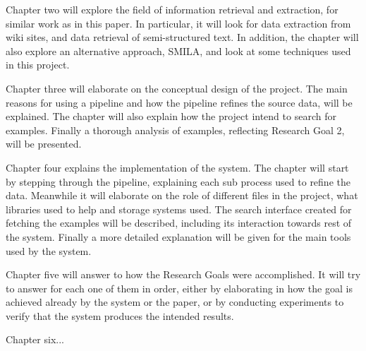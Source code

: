 Chapter two will explore the field of information retrieval and extraction, for similar work as in this paper. In particular, it will look for data extraction from wiki sites, and data retrieval of semi-structured text. In addition, the chapter will also explore an alternative approach, SMILA, and look at some techniques used in this project.

Chapter three will elaborate on the conceptual design of the project. The main reasons for using a pipeline and how the pipeline refines the source data, will be explained. The chapter will also explain how the project intend to search for examples. Finally a thorough analysis of examples, reflecting Research Goal 2, will be presented.

Chapter four explains the implementation of the system. The chapter will start by stepping through the pipeline, explaining each sub process used to refine the data. Meanwhile it will elaborate on the role of different files in the project, what libraries used to help and storage systems used. The search interface created for fetching the examples will be described, including its interaction towards rest of the system. Finally a more detailed explanation will be given for the main tools used by the system.

Chapter five will answer to how the Research Goals were accomplished. It will try to answer for each one of them in order, either by elaborating in how the goal is achieved already by the system or the paper, or by conducting experiments to verify that the system produces the intended results.

Chapter six...


\cleardoublepage